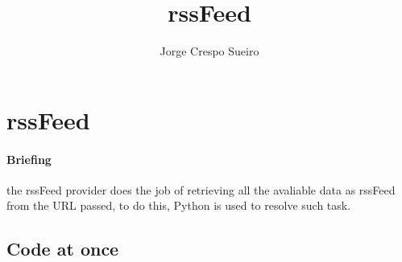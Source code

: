\documentclass{article}
\title{rssFeed}
\begin{document}
\author{Jorge Crespo Sueiro}
\maketitle
\newpage
\tableofcontents
\newpage

\section{rssFeed}
\paragraph{Briefing}
the rssFeed provider does the job of retrieving all the avaliable data as rssFeed from the URL passed, to do this, Python is used to resolve such task.
\subsection{Code at once}
\end{document}
